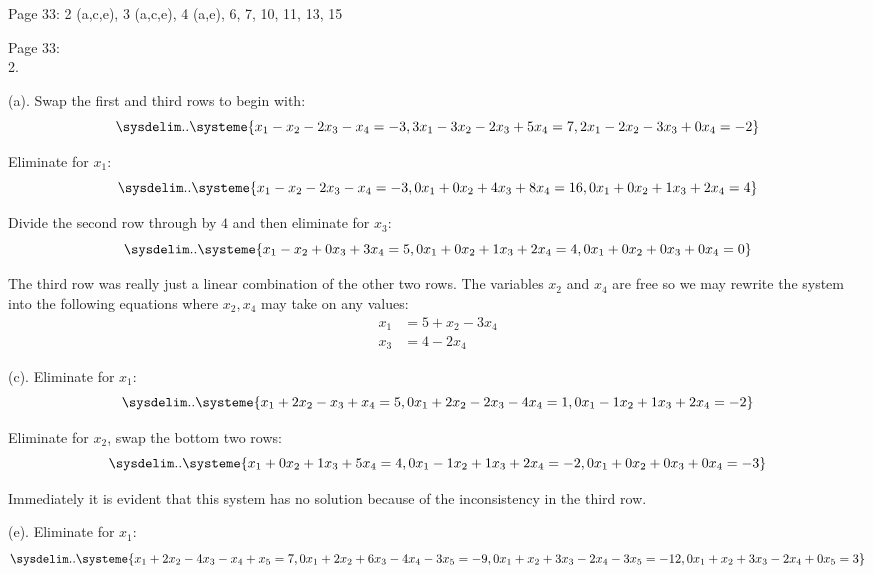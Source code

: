\documentclass[11pt]{article}
\begin{document}
Page 33: 2 (a,c,e), 3 (a,c,e), 4 (a,e), 6, 7, 10, 11, 13, 15

Page 33: \\

2.

(a). Swap the first and third rows to begin with:
\begin{equation*}
    \sysdelim..\systeme{
    x_1 - x_2 - 2x_3 -  x_4 = -3 ,
    3x_1 - 3x_2 - 2x_3 + 5x_4 = 7,
    2x_1 - 2x_2 - 3x_3 + 0x_4 = -2    
    }
\end{equation*}

Eliminate for $x_1$:
\begin{equation*}
    \sysdelim..\systeme{
    x_1 - x_2 - 2x_3 -  x_4 = -3 ,
    0x_1 + 0x_2 + 4x_3 + 8x_4 = 16,
    0x_1 + 0x_2 + 1x_3 + 2x_4 = 4    
    }
\end{equation*}

Divide the second row through by $4$ and then eliminate for $x_3$:
\begin{equation*}
    \sysdelim..\systeme{
    x_1 - x_2 + 0x_3 +  3x_4 = 5 ,
    0x_1 + 0x_2 + 1x_3 + 2x_4 = 4,
    0x_1 + 0x_2 + 0x_3 + 0x_4 = 0    
    }
\end{equation*}

The third row was really just a linear combination of the other two rows. The variables $x_2$ and $x_4$ are free so we may rewrite the system into the following equations where $x_2,x_4$ may take on any values:
\begin{align*}
    x_1 &= 5+x_2-3x_4 \\
    x_3 &= 4-2x_4
\end{align*}

(c). Eliminate for $x_1$:
\begin{equation*}
    \sysdelim..\systeme{
    x_1 + 2x_2 - x_3 + x_4 = 5,
    0x_1 + 2x_2 - 2x_3 - 4x_4 = 1,
    0x_1 - 1x_2 + 1x_3 + 2x_4 = -2
    }
\end{equation*}

Eliminate for $x_2$, swap the bottom two rows:
\begin{equation*}
    \sysdelim..\systeme{
    x_1 + 0x_2 + 1x_3 + 5x_4 = 4,
    0x_1 - 1x_2 + 1x_3 + 2x_4 = -2,
    0x_1 + 0x_2 + 0x_3 + 0x_4 = -3    
    }
\end{equation*}

Immediately it is evident that this system has no solution because of the inconsistency in the third row.

(e). Eliminate for $x_1$:
\begin{equation*}
    \sysdelim..\systeme{
    x_1 + 2x_2 - 4x_3  -x_4  +x_5 = 7,
    0x_1  +2x_2  +6x_3  -4x_4  -3x_5 = -9,
    0x_1  +x_2  +3x_3  -2x_4  -3x_5 = -12,
    0x_1  +x_2  +3x_3  -2x_4  +0x_5 = 3 
    }
\end{equation*}
\end{document}
